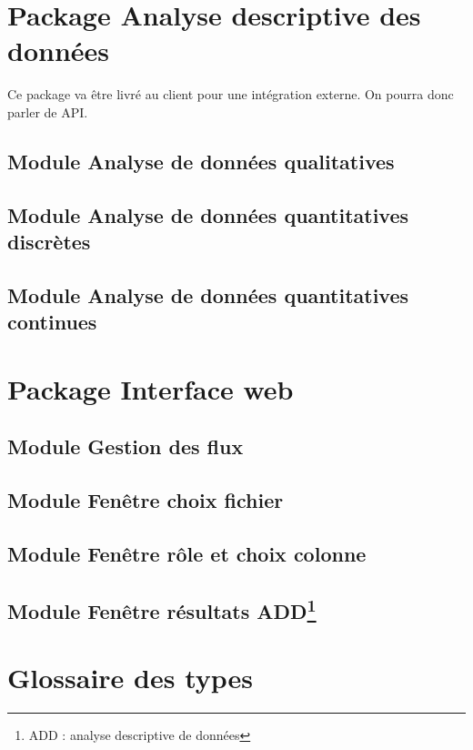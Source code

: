 	
	\section{Package Analyse descriptive des données}
	Ce package va être livré au client pour une intégration externe. On pourra donc parler de API.
	
		\subsection{Module Analyse de données qualitatives}
		
		\subsection{Module Analyse de données quantitatives discrètes}
			
		\subsection{Module Analyse de données quantitatives continues}
		
		
	\section{Package Interface web}
		
		\subsection{Module Gestion des flux}
		
		\subsection{Module Fenêtre choix fichier}
		
		\subsection{Module Fenêtre rôle et choix colonne}
		
		\subsection{Module Fenêtre résultats ADD\footnote{ADD : analyse descriptive de données}}
	
	\section{Glossaire des types}
	
